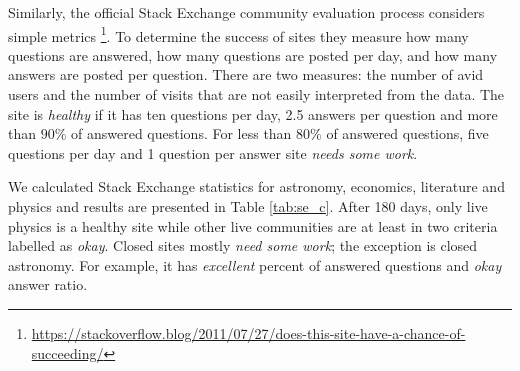 Similarly, the official Stack Exchange community evaluation process considers simple metrics \footnote{\href{https://stackoverflow.blog/2011/07/27/does-this-site-have-a-chance-of-succeeding/}{https://stackoverflow.blog/2011/07/27/does-this-site-have-a-chance-of-succeeding/}}. To determine the success of sites they measure how many questions are answered, how many questions are posted per day, and how many answers are posted per question. There are two measures: the number of avid users and the number of visits that are not easily interpreted from the data. The site is \textit{healthy} if it has ten questions per day, 2.5 answers per question and more than $90\%$ of answered questions. For less than $80\%$ of answered questions, five questions per day and 1 question per answer site \textit{needs some work}. 

We calculated Stack Exchange statistics for astronomy, economics, literature and physics and results are presented in Table \ref{tab:se_c}. After 180 days, only live physics is a healthy site while other live communities are at least in two criteria labelled as \textit{okay}. Closed sites mostly \textit{need some work}; the exception is closed astronomy. For example, it has \textit{excellent} percent of answered questions and \textit{okay} answer ratio.  


